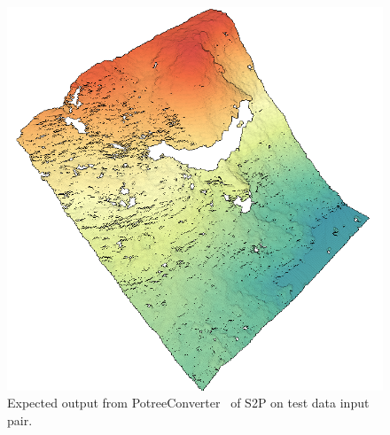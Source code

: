 \documentclass[paper=a4, fontsize=11pt, onecolumn, tikz, dvipsnames, svgnames, x11names]{article}
\begin{document}
\begin{figure}[H]
    \centering
    \includegraphics[height = 0.4\textheight]{elevation_intro.png}
    \caption{Expected output from PotreeConverter~\cite{PotreeConverter} of S2P on test data input pair.}
    \label{fig_expected_output_pair}
\end{figure}
\end{document}
